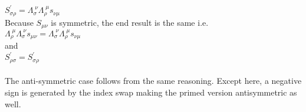 \documentclass[prb,preprint]
{revtex4-1}
\begin{document}
\\
$S^\prime_{\sigma\rho} = \Lambda_\sigma^{\;\nu}\Lambda_\rho^{\;\mu}s_{\nu\mu}$
\\
Because $S_{\mu\nu}$ is symmetric, the end result is the same i.e.
\\
$\Lambda_\rho^{\;\mu}\Lambda_\sigma^{\;\nu}s_{\mu\nu} = \Lambda_\sigma^{\;\nu}\Lambda_\rho^{\;\mu}s_{\nu\mu}$
\\
and
\\
$S^\prime_{\rho\sigma} = S^\prime_{\sigma\rho}$
\\
\\
The anti-symmetric case follows from the same reasoning.  Except here, a negative sign is generated by the index swap making the primed version antisymmetric as well.
\\












\end{document}

